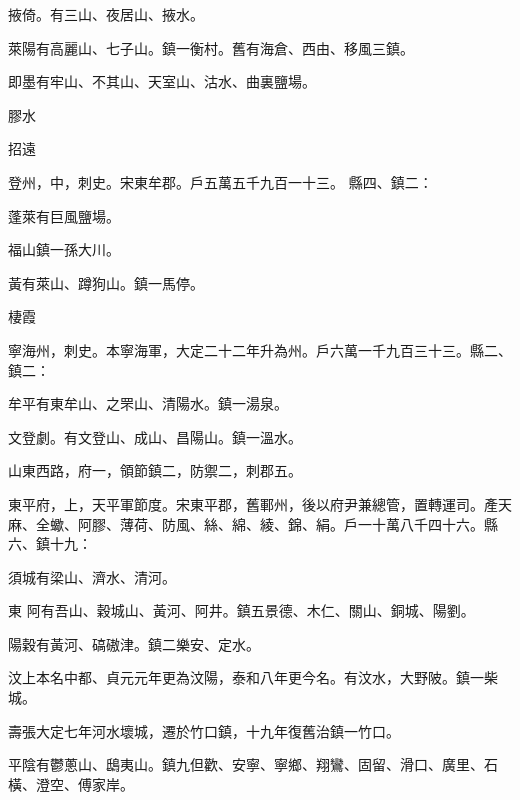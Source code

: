 \begin{pinyinscope}
 掖倚。有三山、夜居山、掖水。



 萊陽有高麗山、七子山。鎮一衡村。舊有海倉、西由、移風三鎮。



 即墨有牢山、不其山、天室山、沽水、曲裏鹽場。



 膠水



 招遠



 登州，中，刺史。宋東牟郡。戶五萬五千九百一十三。
 縣四、鎮二：



 蓬萊有巨風鹽場。



 福山鎮一孫大川。



 黃有萊山、蹲狗山。鎮一馬停。



 棲霞



 寧海州，刺史。本寧海軍，大定二十二年升為州。戶六萬一千九百三十三。縣二、鎮二：



 牟平有東牟山、之罘山、清陽水。鎮一湯泉。



 文登劇。有文登山、成山、昌陽山。鎮一溫水。



 山東西路，府一，領節鎮二，防禦二，刺郡五。



 東平府，上，天平軍節度。宋東平郡，舊鄆州，後以府尹兼總管，置轉運司。產天麻、全蠍、阿膠、薄荷、防風、絲、綿、綾、錦、絹。戶一十萬八千四十六。縣六、鎮十九：



 須城有梁山、濟水、清河。



 東
 阿有吾山、穀城山、黃河、阿井。鎮五景德、木仁、關山、銅城、陽劉。



 陽穀有黃河、碻磝津。鎮二樂安、定水。



 汶上本名中都、貞元元年更為汶陽，泰和八年更今名。有汶水，大野陂。鎮一柴城。



 壽張大定七年河水壞城，遷於竹口鎮，十九年復舊治鎮一竹口。



 平陰有鬱蔥山、鴟夷山。鎮九但歡、安寧、寧鄉、翔鸞、固留、滑口、廣里、石橫、澄空、傅家岸。




\end{pinyinscope}
